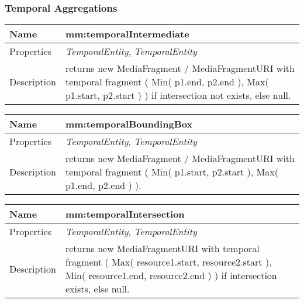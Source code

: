 \subsubsection*{Temporal Aggregations}
\begin{tabular}{|p{3cm}|p{10cm}|}
\hline Name & mm:temporalIntermediate\\
\hline Properties & \textit{TemporalEntity}, \textit{TemporalEntity} \\
\hline Description & returns new MediaFragment / MediaFragmentURI with temporal fragment ( Min( p1.end, p2.end ), Max( p1.start, p2.start ) ) if intersection not exists, else null.\\
\hline
\end{tabular}
\vspace{0.3cm}
\newline
\begin{tabular}{|p{3cm}|p{10cm}|}
\hline Name & mm:temporalBoundingBox\\
\hline Properties & \textit{TemporalEntity}, \textit{TemporalEntity} \\
\hline Description & returns new MediaFragment / MediaFragmentURI with temporal fragment ( Min( p1.start, p2.start ), Max( p1.end, p2.end ) ).\\
\hline
\end{tabular}
\vspace{0.3cm}
\newline
\begin{tabular}{|p{3cm}|p{10cm}|}
\hline Name & mm:temporalIntersection\\
\hline Properties & \textit{TemporalEntity}, \textit{TemporalEntity} \\
\hline Description & returns new MediaFragmentURI with temporal fragment ( Max( resource1.start, resource2.start ), Min( resource1.end, resource2.end ) ) if intersection exists, else null.\\
\hline
\end{tabular}
\vspace{0.3cm}
\newline
